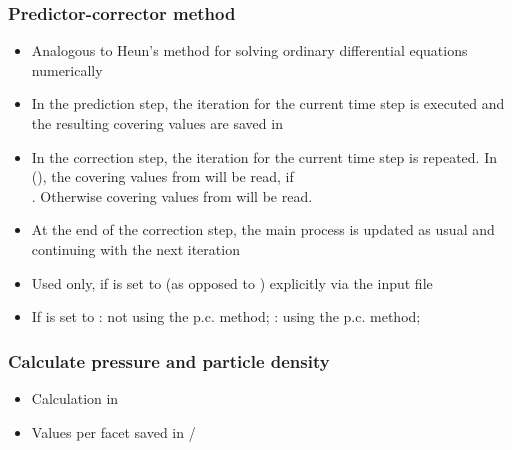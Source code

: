 
\subsubsection{Predictor-corrector method}
\begin{itemize}[noitemsep,topsep=0pt, partopsep=0pt]
\item{Analogous to Heun's method for solving ordinary differential equations numerically}
\item{In the prediction step, the iteration for the current time step is executed and the resulting covering values are saved in }
\item{In the correction step, the iteration for the current time step is repeated. In  (), the covering values from  will be read, if\\. Otherwise covering values from  will be read.}
\item{At the end of the correction step, the main process is updated as usual and continuing with the next iteration}
\item{Used only, if  is set to  (as opposed to ) explicitly via the input file}
\item{If  is set to :  not using the p.c. method; :  using the p.c. method;}
\end{itemize}

\subsubsection{Calculate pressure and particle density}
\begin{itemize}[noitemsep,topsep=0pt, partopsep=0pt]
\item Calculation in  
\item Values per facet saved in /
\end{itemize}

